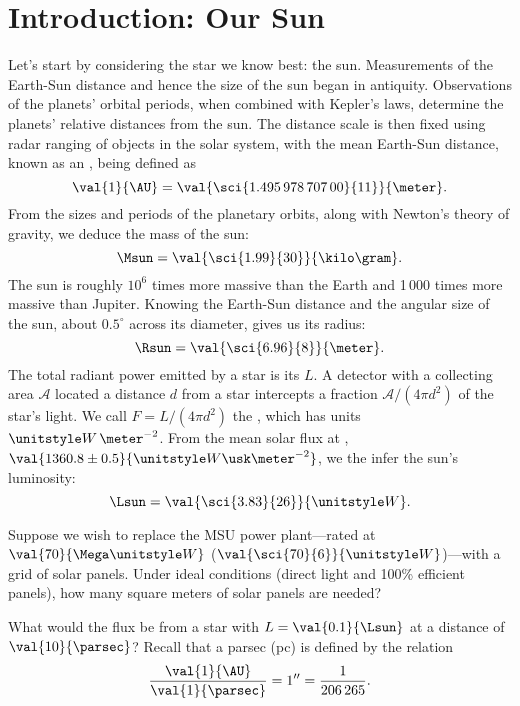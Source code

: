 
\section{Introduction: Our Sun}

Let's start by considering the star we know best: the sun. Measurements of the Earth-Sun distance and hence the size of the sun began in antiquity. Observations of the planets' orbital periods, when combined with Kepler's laws, determine the planets' relative distances from the sun. The distance scale is then fixed using radar ranging of objects in the solar system, with the mean Earth-Sun distance, known as an , being defined\cite{Luzum2011The-IAU-2009-sy} as
\[
	\val{1}{\AU} = \val{\sci{1.495\,978\,707\,00}{11}}{\meter}.
\]
From the sizes and periods of the planetary orbits, along with Newton's theory of gravity, we deduce the mass of the sun:
\[
	\Msun = \val{\sci{1.99}{30}}{\kilo\gram}.
\]
The sun is roughly $10^{6}$ times more massive than the Earth and 1\,000 times more massive than Jupiter. Knowing the Earth-Sun distance and the angular size of the sun, about $0.5^{\circ}$ across its diameter, gives us its radius:
\[
	\Rsun = \val{\sci{6.96}{8}}{\meter}.
\]
The total radiant power emitted by a star is its
 $L$. A detector with a collecting area $\mathcal{A}$ located a distance $d$ from a star intercepts a fraction $\mathcal{A}/(4\pi d^{2})$ of the star's light.  We call $F = L/(4\pi d^{2})$ the , which has units $\watt\,\meter^{-2}$. From the mean solar flux\cite{Kopp2011A-new-lower-val} at , $\val{1360.8\pm0.5}{\watt\usk\meter^{-2}}$, we the infer the sun's luminosity:
\[
	\Lsun = \val{\sci{3.83}{26}}{\watt}.
\]

\begin{exercisebox}
Suppose we wish to replace the MSU power plant---rated at $\val{70}{\Mega\watt}$ ($\val{\sci{70}{6}}{\watt}$)---with a grid of solar panels. Under ideal conditions (direct light and 100\% efficient panels), how many square meters of solar panels are needed?
\end{exercisebox}

\begin{exercisebox}
What would the flux be from a star with $L = \val{0.1}{\Lsun}$ at a distance of $\val{10}{\parsec}$?
Recall that a parsec (pc) is defined by the relation
\[
	\frac{\val{1}{\AU}}{\val{1}{\parsec}} = 1'' = \frac{1}{206\,265}.
\]
\end{exercisebox}


